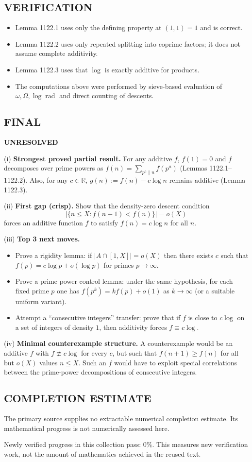 \subsection*{VERIFICATION}
\begin{itemize}
\item Lemma 1122.1 uses only the defining property at $(1,1)=1$ and is correct.
\item Lemma 1122.2 uses only repeated splitting into coprime factors; it does not assume complete additivity.
\item Lemma 1122.3 uses that $\log$ is exactly additive for products.
\item The computations above were performed by sieve-based evaluation of $\omega,\Omega,\log\operatorname{rad}$ and direct counting of descents.
\end{itemize}

\subsection*{FINAL}
\textbf{UNRESOLVED}

(i) \textbf{Strongest proved partial result.}
For any additive $f$, $f(1)=0$ and $f$ decomposes over prime powers as $f(n)=\sum_{p^a\parallel n} f(p^a)$ (Lemmas 1122.1--1122.2). Also, for any $c\in\mathbb{R}$, $g(n):=f(n)-c\log n$ remains additive (Lemma 1122.3).

(ii) \textbf{First gap (crisp).}
Show that the density-zero descent condition
\[
\lvert\{n\le X: f(n+1)<f(n)\}\rvert=o(X)
\]
forces an additive function $f$ to satisfy $f(n)=c\log n$ for all $n$.

(iii) \textbf{Top 3 next moves.}
\begin{itemize}
\item Prove a rigidity lemma: if $\lvert A\cap[1,X]\rvert=o(X)$ then there exists $c$ such that $f(p)=c\log p+o(\log p)$ for primes $p\to\infty$.
\item Prove a prime-power control lemma: under the same hypothesis, for each fixed prime $p$ one has $f(p^k)=k f(p)+o(1)$ as $k\to\infty$ (or a suitable uniform variant).
\item Attempt a ``consecutive integers'' transfer: prove that if $f$ is close to $c\log$ on a set of integers of density $1$, then additivity forces $f\equiv c\log$.
\end{itemize}

(iv) \textbf{Minimal counterexample structure.}
A counterexample would be an additive $f$ with $f\not\equiv c\log$ for every $c$, but such that $f(n+1)\ge f(n)$ for all but $o(X)$ values $n\le X$. Such an $f$ would have to exploit special correlations between the prime-power decompositions of consecutive integers.




\subsection*{COMPLETION ESTIMATE}
The primary source supplies no extractable numerical completion estimate. Its mathematical progress is not numerically assessed here.

Newly verified progress in this collection pass: $0\%$. This measures new verification work, not the amount of mathematics achieved in the reused text.
